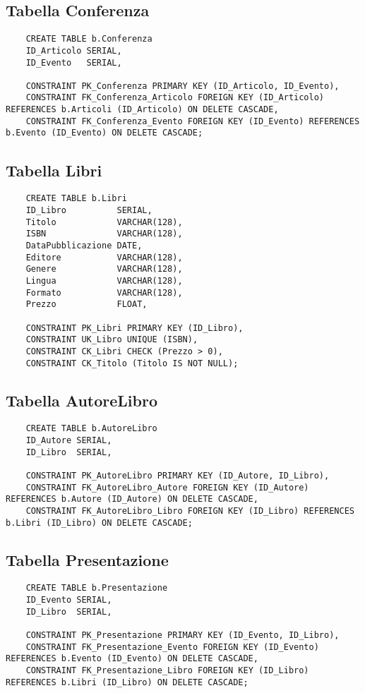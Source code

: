 \subsection{Tabella Conferenza}
\begin{lstlisting}
    CREATE TABLE b.Conferenza
    ID_Articolo SERIAL,
    ID_Evento   SERIAL,

    CONSTRAINT PK_Conferenza PRIMARY KEY (ID_Articolo, ID_Evento),
    CONSTRAINT FK_Conferenza_Articolo FOREIGN KEY (ID_Articolo) REFERENCES b.Articoli (ID_Articolo) ON DELETE CASCADE,
    CONSTRAINT FK_Conferenza_Evento FOREIGN KEY (ID_Evento) REFERENCES b.Evento (ID_Evento) ON DELETE CASCADE;
\end{lstlisting}

\subsection{Tabella Libri}
\begin{lstlisting}
    CREATE TABLE b.Libri
    ID_Libro          SERIAL,
    Titolo            VARCHAR(128),
    ISBN              VARCHAR(128),
    DataPubblicazione DATE,
    Editore           VARCHAR(128),
    Genere            VARCHAR(128),
    Lingua            VARCHAR(128),
    Formato           VARCHAR(128),
    Prezzo            FLOAT,

    CONSTRAINT PK_Libri PRIMARY KEY (ID_Libro),
    CONSTRAINT UK_Libro UNIQUE (ISBN),
    CONSTRAINT CK_Libri CHECK (Prezzo > 0),
    CONSTRAINT CK_Titolo (Titolo IS NOT NULL);
\end{lstlisting}

\subsection{Tabella AutoreLibro}
\begin{lstlisting}
    CREATE TABLE b.AutoreLibro
    ID_Autore SERIAL,
    ID_Libro  SERIAL,

    CONSTRAINT PK_AutoreLibro PRIMARY KEY (ID_Autore, ID_Libro),
    CONSTRAINT FK_AutoreLibro_Autore FOREIGN KEY (ID_Autore) REFERENCES b.Autore (ID_Autore) ON DELETE CASCADE,
    CONSTRAINT FK_AutoreLibro_Libro FOREIGN KEY (ID_Libro) REFERENCES b.Libri (ID_Libro) ON DELETE CASCADE;
\end{lstlisting}

\subsection{Tabella Presentazione}
\begin{lstlisting}
    CREATE TABLE b.Presentazione
    ID_Evento SERIAL,
    ID_Libro  SERIAL,

    CONSTRAINT PK_Presentazione PRIMARY KEY (ID_Evento, ID_Libro),
    CONSTRAINT FK_Presentazione_Evento FOREIGN KEY (ID_Evento) REFERENCES b.Evento (ID_Evento) ON DELETE CASCADE,
    CONSTRAINT FK_Presentazione_Libro FOREIGN KEY (ID_Libro) REFERENCES b.Libri (ID_Libro) ON DELETE CASCADE;
\end{lstlisting}

